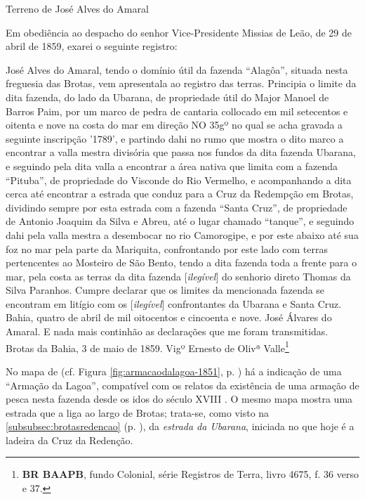 \begin{citacao}
Terreno de José Alves do Amaral

Em obediência ao despacho do senhor Vice-Presidente Missias de Leão, de 29 de abril de 1859, exarei o seguinte registro:

José Alves do Amaral, tendo o domínio útil da fazenda ``Alagôa'', situada nesta freguesia das Brotas, vem apresentala ao registro das terras. Principia o limite da dita fazenda, do lado da Ubarana, de propriedade útil do Major Manoel de Barros Paim, por um marco de pedra de cantaria collocado em mil setecentos e oitenta e nove na costa do mar em direção NO 35gº no qual se acha gravada a seguinte inscripção '1789', e partindo dahi no rumo que mostra o dito marco a encontrar a valla mestra divisória que passa nos fundos da dita fazenda Ubarana, e seguindo pela dita valla a encontrar a área nativa que limita com a fazenda ``Pituba'', de propriedade do Visconde do Rio Vermelho, e acompanhando a dita cerca até encontrar a estrada que conduz para a Cruz da Redempção em Brotas, dividindo sempre por esta estrada com a fazenda ``Santa Cruz'', de propriedade de Antonio Joaquim da Silva e Abreu, até o lugar chamado ``tanque'', e seguindo dahi pela valla mestra a desembocar no rio Camorogipe, e por este abaixo até sua foz no mar pela parte da Mariquita, confrontando por este lado com terras pertencentes ao Mosteiro de São Bento, tendo a dita fazenda toda a frente para o mar, pela costa as terras da dita fazenda [\textit{ilegível}] do senhorio direto Thomas da Silva Paranhos. Cumpre declarar que os limites da mencionada fazenda se encontram em litígio com os [\textit{ilegível}] confrontantes da Ubarana e Santa Cruz. Bahia, quatro de abril de mil oitocentos e cincoenta e nove. José Álvares do Amaral. E nada mais continhão as declarações que me foram transmitidas. Brotas da Bahia, 3 de maio de 1859. Vigº Ernesto de Olivª Valle\footnote{\textbf{BR BAAPB}, fundo Colonial, série Registros de Terra, livro 4675, f. 36 verso e 37.}
\end{citacao}

No mapa de  (cf. Figura \autoref{fig:armacaodalagoa-1851}, p. \pageref{fig:armacaodalagoa-1851}) há a indicação de uma ``Armação da Lagoa'', compatível com os relatos da existência de uma armação de pesca nesta fazenda desde os idos do século XVIII \cite[p.~120-121]{campos_alagoa_1942}. O mesmo mapa mostra uma estrada que a liga ao largo de Brotas; trata-se, como visto na \autoref{subsubsec:brotasredencao} (p. \pageref{subsubsec:brotasredencao}), da \textit{estrada da Ubarana}, iniciada no que hoje é a ladeira da Cruz da Redenção.


